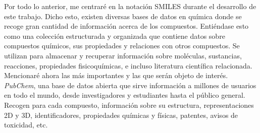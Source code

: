 Por todo lo anterior, me centraré en la notación SMILES durante el desarrollo de este trabajo. Dicho esto, existen diversas bases de datos en química donde se recoge gran cantidad de información acerca de los compuestos. Entiéndase esto como una colección estructurada y organizada que contiene datos sobre compuestos químicos, sus propiedades y relaciones con otros compuestos. Se utilizan para almacenar y recuperar información sobre moléculas, sustancias, reacciones, propiedades fisicoquímicas, e incluso literatura científica relacionada. Mencionaré ahora las más importantes y las que serán objeto de interés. \emph{PubChem}, una base de datos abierta que sirve información a millones de usuarios en todo el mundo, desde investigadores y estudiantes hasta el público general. Recogen para cada compuesto, información sobre su estructura, representaciones 2D y 3D, identificadores, propiedades químicas y físicas, patentes, avisos de toxicidad, etc. \cite{pubchem_website} 


